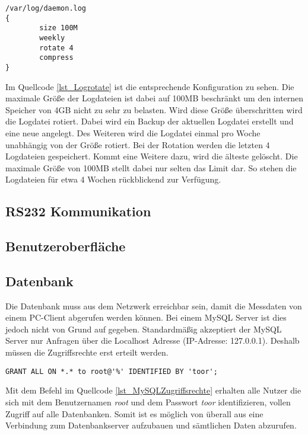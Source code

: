 \begin{lstlisting}[caption={Logrotate},label=lst_Logrotate]
/var/log/daemon.log
{
        size 100M
        weekly
        rotate 4
        compress
}
\end{lstlisting}

Im Quellcode \ref{lst_Logrotate} ist die entsprechende Konfiguration zu sehen. Die maximale Größe der Logdateien ist dabei auf 100MB beschränkt um den internen Speicher von 4GB nicht zu sehr zu belasten. Wird diese Größe überschritten wird die Logdatei rotiert. Dabei wird ein Backup der aktuellen Logdatei erstellt und eine neue angelegt. Des Weiteren wird die Logdatei einmal pro Woche unabhängig von der Größe rotiert. Bei der Rotation werden die letzten 4 Logdateien gespeichert. Kommt eine Weitere dazu, wird die älteste gelöscht. Die maximale Größe von 100MB stellt dabei nur selten das Limit dar. So stehen die Logdateien für etwa 4 Wochen rückblickend zur Verfügung.



\subsection{RS232 Kommunikation}


\subsection{Benutzeroberfläche}


\subsection{Datenbank}

Die Datenbank muss aus dem Netzwerk erreichbar sein, damit die Messdaten von einem PC-Client abgerufen werden können. Bei einem MySQL Server ist dies jedoch nicht von Grund auf gegeben. Standardmäßig akzeptiert der MySQL Server nur Anfragen über die Localhost Adresse (IP-Adresse: 127.0.0.1). Deshalb müssen die Zugriffsrechte erst erteilt werden.\\

\begin{lstlisting}[caption={MySQL Zugriffsrechte},label=lst_MySQLZugriffsrechte]
GRANT ALL ON *.* to root@'%' IDENTIFIED BY 'toor';
\end{lstlisting}

Mit dem Befehl im Quellcode \ref{lst_MySQLZugriffsrechte} erhalten alle Nutzer die sich mit dem Benutzernamen \textit{root} und dem Passwort \textit{toor} identifizieren, vollen Zugriff auf alle Datenbanken. Somit ist es möglich von überall aus eine Verbindung zum Datenbankserver aufzubauen und sämtlichen Daten abzurufen.\\
\\


